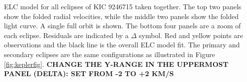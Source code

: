 \label{fig:ELCresult} ELC model for all eclipses of KIC 9246715 taken together. The top two panels show the folded radial velocities, while the middle two panels show the folded light curve. A single full orbit is shown. The bottom four panels are a zoom of each eclipse. Residuals are indicated by a $\Delta$ symbol. Red and yellow points are observations and the black line is the overall ELC model fit. The primary and secondary eclipses are the same configurations as illustrated in Figure \ref{fig:keplerfig}.
{\bf{CHANGE THE Y-RANGE IN THE UPPERMOST PANEL (DELTA): SET FROM -2 TO +2 KM/S}}  